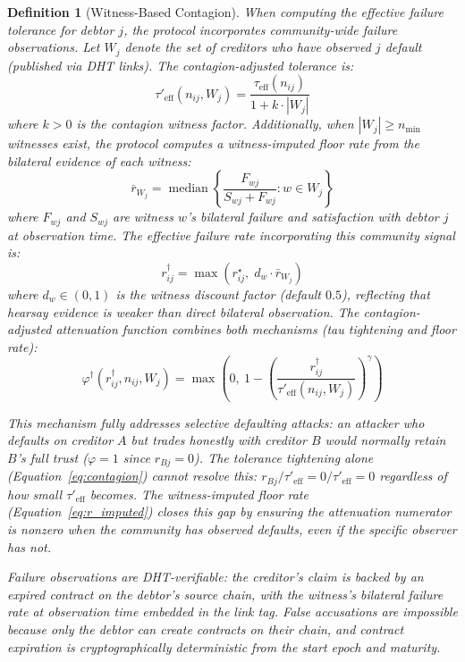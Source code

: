 \documentclass[11pt]{article}
\newtheorem{definition}[theorem]{Definition}
\begin{document}
\begin{definition}[Witness-Based Contagion]\label{def:contagion}
When computing the effective failure tolerance for debtor $j$, the protocol incorporates \emph{community-wide failure observations}. Let $W_j$ denote the set of creditors who have observed $j$ default (published via DHT links). The contagion-adjusted tolerance is:
\begin{equation}\label{eq:contagion}
    \tau'_{\text{eff}}(n_{ij}, W_j) = \frac{\tau_{\text{eff}}(n_{ij})}{1 + k \cdot |W_j|}
\end{equation}
where $k > 0$ is the \emph{contagion witness factor}. Additionally, when $|W_j| \geq n_{\min}$ witnesses exist, the protocol computes a \emph{witness-imputed floor rate} from the bilateral evidence of each witness:
\begin{equation}\label{eq:witness_rate}
    \bar{r}_{W_j} = \operatorname{median}\!\left\{\frac{F_{wj}}{S_{wj} + F_{wj}} : w \in W_j\right\}
\end{equation}
where $F_{wj}$ and $S_{wj}$ are witness $w$'s bilateral failure and satisfaction with debtor $j$ at observation time. The effective failure rate incorporating this community signal is:
\begin{equation}\label{eq:r_imputed}
    r^{\dagger}_{ij} = \max\!\left(r^{\star}_{ij},\; d_w \cdot \bar{r}_{W_j}\right)
\end{equation}
where $d_w \in (0,1)$ is the \emph{witness discount factor} (default $0.5$), reflecting that hearsay evidence is weaker than direct bilateral observation. The contagion-adjusted attenuation function combines both mechanisms (tau tightening and floor rate):
\begin{equation}
    \varphi^{\dagger}(r^{\dagger}_{ij}, n_{ij}, W_j) = \max\!\left(0,\ 1 - \left(\frac{r^{\dagger}_{ij}}{\tau'_{\text{eff}}(n_{ij}, W_j)}\right)^{\!\gamma}\right)
\end{equation}

This mechanism fully addresses \emph{selective defaulting} attacks: an attacker who defaults on creditor $A$ but trades honestly with creditor $B$ would normally retain $B$'s full trust ($\varphi = 1$ since $r_{Bj} = 0$). The tolerance tightening alone (Equation~\ref{eq:contagion}) cannot resolve this: $r_{Bj} / \tau'_{\text{eff}} = 0 / \tau'_{\text{eff}} = 0$ regardless of how small $\tau'_{\text{eff}}$ becomes. The witness-imputed floor rate (Equation~\ref{eq:r_imputed}) closes this gap by ensuring the attenuation numerator is nonzero when the community has observed defaults, even if the specific observer has not.

Failure observations are \emph{DHT-verifiable}: the creditor's claim is backed by an expired contract on the debtor's source chain, with the witness's bilateral failure rate at observation time embedded in the link tag. False accusations are impossible because only the debtor can create contracts on their chain, and contract expiration is cryptographically deterministic from the start epoch and maturity.
\end{definition}
\end{document}
